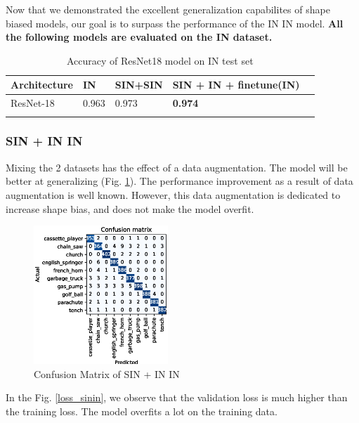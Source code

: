 \documentclass{article}
\begin{document}
Now that we demonstrated the excellent generalization capabilites of shape biased models,
our goal is to surpass the performance of the IN \texorpdfstring{\textrightarrow} .IN model.
\textbf{All the following models are evaluated on the IN dataset.}

\begin{table}[h!]
  \begin{tabular}{lllll}
  \Xhline{2\arrayrulewidth}
  Architecture & IN & SIN+SIN  & SIN + IN + finetune(IN) \\ \hline
  ResNet-18    & 0.963    & 0.973   & \textbf{0.974}    \\ \Xhline{2\arrayrulewidth}
  \end{tabular}
  \caption{Accuracy of ResNet18 model on IN test set}
\end{table}


\subsubsection{SIN + IN \texorpdfstring{\textrightarrow} .IN}

Mixing the 2 datasets has the effect of a data augmentation. The model will be better
at generalizing (Fig. \ref{cm_sinin-in}). The performance improvement as a result of data augmentation 
is well known. However, this data augmentation is dedicated to increase shape bias,
and does not make the model overfit.

\begin{figure}[h!]
  \includegraphics[width = 0.45\textwidth]{imgs/sinin/sinin-in_confusion_matrix_0.973.eps}
  \caption{Confusion Matrix of SIN + IN \texorpdfstring{\textrightarrow} .IN}
  \label{cm_sinin-in}
\end{figure}

In the Fig. \ref{loss_sinin}, we observe that the validation loss is much higher than the training
loss. The model overfits a lot on the training data.
\end{document}
